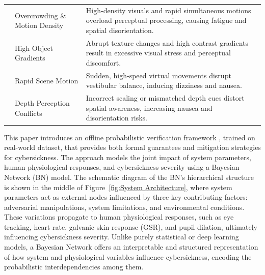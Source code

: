 \documentclass{vgtc}                          %
\begin{document}
\begin{table}[t]
\begin{tabular}{p{2cm} p{3.4cm} p{}}
\hline
{}  
 & Overcrowding \& Motion Density & High-density visuals and rapid simultaneous motions overload perceptual processing, causing fatigue and spatial disorientation. \\
 & High Object Gradients & Abrupt texture changes and high contrast gradients result in excessive visual stress and perceptual discomfort. \\
 & Rapid Scene Motion & Sudden, high-speed virtual movements disrupt vestibular balance, inducing dizziness and nausea. \\
 & Depth Perception Conflicts & Incorrect scaling or mismatched depth cues distort spatial awareness, increasing nausea and disorientation risks. \\
\hline
\end{tabular}
\end{table}

This paper introduces
an offline
probabilistic verification framework
, trained on real-world dataset,
that provides both formal guarantees and mitigation strategies for cybersickness. The approach models the joint impact of system parameters, human physiological responses, and cybersickness severity using a Bayesian Network (BN) model. The schematic diagram of the BN's hierarchical structure is shown in the middle of Figure~\ref{fig:System Architecture}, where system parameters act as external nodes influenced by three key contributing factors: adversarial manipulations, system limitations, and environmental conditions. These variations propagate to human physiological responses, such as eye tracking, heart rate, galvanic skin response (GSR), and pupil dilation, ultimately influencing cybersickness severity. Unlike purely statistical or deep learning models, a Bayesian Network offers an interpretable and structured representation of how system and physiological variables influence cybersickness, encoding the probabilistic interdependencies among them.

\end{document}
